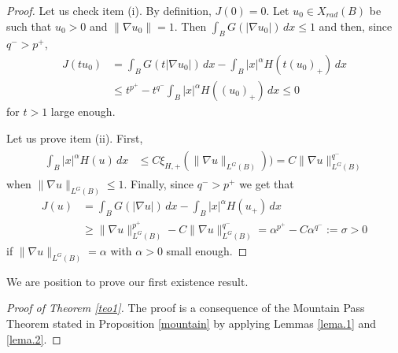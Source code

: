 \documentclass[leqno,twoside, 12pt]{amsart}
\theoremstyle{plain}
\numberwithin{equation}{section} \numberwithin{figure}{section}
\theoremstyle{definition}
\numberwithin{equation}{section}
\begin{document}
\begin{proof}
Let us check item (i). By definition, $J(0)=0$.  Let $u_0\in X_{rad}(B)$ be such that $u_0>0$ and $\|\nabla u_0\|=1$. Then $\int_B G(|\nabla u_0|)\,dx \leq 1$ and then, since  $q^->p^+$, 
\begin{align*}
J(tu_0)&= \int_B G(t|\nabla u_0|)\,dx - 	 \int_B |x|^\alpha H(t (u_0)_{+})\,dx\\
&\leq 
t^{p^+} - t^{q^-} \int_B |x|^\alpha H( (u_0)_{+})\,dx \leq 0
\end{align*}
for $t>1$ large enough.

Let us   prove item (ii). First,
\begin{align*} 
\begin{split}
\int_B |x|^\alpha H( u )\,dx &\leq  
C \xi_{H,+}(\|\nabla u\|_{L^G(B)})) = C \|\nabla u\|_{L^G(B)}^{q^-}
\end{split}
\end{align*}
when $\|\nabla u\|_{L^G(B)} \leq 1$. Finally, since $q^->p^+$ we get that
\begin{align*}
J(u)&= \int_B G(|\nabla u|)\,dx -  \int_B |x|^\alpha H( u_{+})\,dx\\
&\geq
\|\nabla u\|_{L^G(B)}^{p^+} - C \|\nabla u\|_{L^G(B)}^{q^-} =  \alpha^{p^+}-C \alpha^{q^-}:=\sigma >0
\end{align*}
if $\|\nabla u\|_{L^G(B)} =\alpha $ with $\alpha>0$ small enough.
\end{proof}


We are position to prove our first existence result.

\begin{proof}[Proof of Theorem \ref{teo1}]
The proof is a consequence of the Mountain Pass Theorem stated in Proposition \ref{mountain} by applying Lemmas \ref{lema.1} and \ref{lema.2}.
\end{proof}
\end{document}

